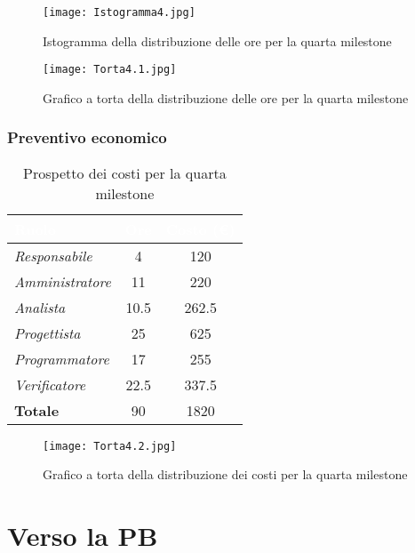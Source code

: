\begin{figure}[H]
    \texttt{[image: Istogramma4.jpg]}
    \caption{Istogramma della distribuzione delle ore per la quarta milestone}
\end{figure}

\begin{figure}[H]
    \texttt{[image: Torta4.1.jpg]}
    \caption{Grafico a torta della distribuzione delle ore per la quarta milestone}
\end{figure}

\newpage
\subsubsection{Preventivo economico}

\begin{table}[H]
    \renewcommand\arraystretch{1.5}
    \centering
    \begin{tabular}{|l|c|c|}
    \hline
    \rowcolor[HTML]{036400}
    \textcolor{white}{\textbf{Ruolo}} & \multicolumn{1}{l|}{\textcolor{white}{\textbf{Ore}}} & \multicolumn{1}{l|}{\textcolor{white}{\textbf{Costo (€)}}} \\ \hline
    \rowcolor[HTML]{EFEFEF}\textit{Responsabile}   & 4    & 120     \\ \hline
    \rowcolor[HTML]{C0C0C0}\textit{Amministratore} & 11   & 220     \\ \hline
    \rowcolor[HTML]{EFEFEF}\textit{Analista}       & 10.5 & 262.5   \\ \hline
    \rowcolor[HTML]{C0C0C0}\textit{Progettista}    & 25   & 625     \\ \hline
    \rowcolor[HTML]{EFEFEF}\textit{Programmatore}  & 17   & 255     \\ \hline
    \rowcolor[HTML]{C0C0C0}\textit{Verificatore}   & 22.5 & 337.5   \\ \hline
    \rowcolor[HTML]{EFEFEF}\textbf{Totale}         & 90   & 1820    \\ \hline
    \end{tabular}
    \caption{Prospetto dei costi per la quarta milestone}
\end{table}

\begin{figure}[H]
    \texttt{[image: Torta4.2.jpg]}
    \caption{Grafico a torta della distribuzione dei costi per la quarta milestone}
\end{figure}

\newpage
\section{Verso la PB}

